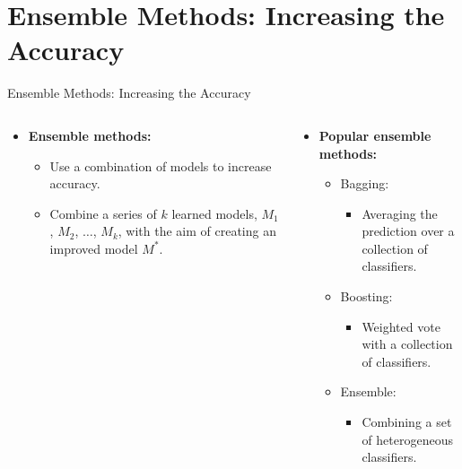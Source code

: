 \section{Ensemble Methods: Increasing the Accuracy}

\begin{frame}{Ensemble Methods: Increasing the Accuracy}
  \begin{columns}
    \begin{column}{0.4\textwidth}
      \centering
      \begin{itemize}
      \item \textbf{{\color{airforceblue}Ensemble} methods:}
        \begin{itemize}
        \item Use a combination of models to increase accuracy.
        \item Combine a series of $k$ learned models, $M_1$, $M_2$, $\ldots$, $M_k$, with the aim of creating an improved model $M^*$.
        \end{itemize}
      \end{itemize}
    \end{column}
    \begin{column}{0.5\textwidth}
      \centering
      \begin{itemize}
      \item \textbf{Popular ensemble methods:}
        \begin{itemize}
        \item Bagging:
          \begin{itemize}
          \item Averaging the prediction over a collection of classifiers.
          \end{itemize}
        \item Boosting:
          \begin{itemize}
          \item Weighted vote with a collection of classifiers.
          \end{itemize}
        \item Ensemble:
          \begin{itemize}
          \item Combining a set of heterogeneous classifiers.
          \end{itemize}
        \end{itemize}
      \end{itemize}
    \end{column}
  \end{columns}
\end{frame}

